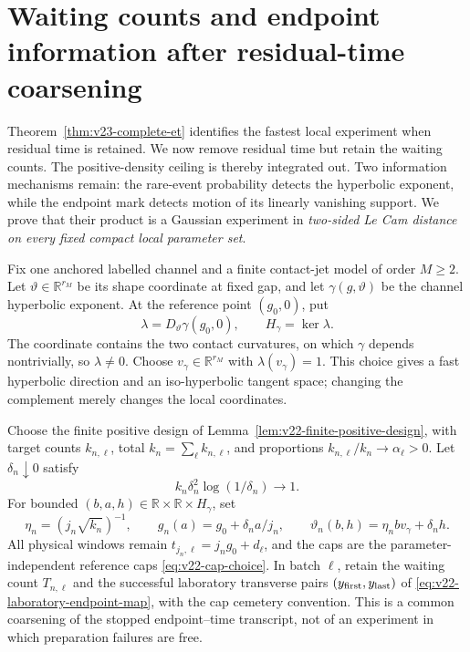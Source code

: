 \section{Waiting counts and endpoint information after residual-time coarsening}
\label{sec:v23-count-endpoint}

Theorem~\ref{thm:v23-complete-et} identifies the fastest local experiment
when residual time is retained.  We now remove residual time but retain the
waiting counts.  The positive-density ceiling is thereby integrated out.
Two information mechanisms remain: the rare-event probability detects the
hyperbolic exponent, while the endpoint mark detects motion of its linearly
vanishing support.  We prove that their product is a Gaussian experiment in
\emph{two-sided Le Cam distance on every fixed compact local parameter set}.

Fix one anchored labelled channel and a finite contact-jet model of order
\(M\ge2\).  Let \(\vartheta\in\mathbb R^{r_M}\) be its shape coordinate at
fixed gap, and let \(\gamma(g,\vartheta)\) be the channel hyperbolic exponent.
At the reference point \((g_0,0)\), put
\[
 \lambda=D_\vartheta\gamma(g_0,0),\qquad H_\gamma=\ker\lambda.
\]
The coordinate contains the two contact curvatures, on which \(\gamma\)
depends nontrivially, so \(\lambda\ne0\).  Choose
\(v_\gamma\in\mathbb R^{r_M}\) with \(\lambda(v_\gamma)=1\).
This choice gives a fast hyperbolic direction and an iso-hyperbolic tangent
space; changing the complement merely changes the local coordinates.

Choose the finite positive design of
Lemma~\ref{lem:v22-finite-positive-design}, with target counts
\(k_{n,\ell}\), total \(k_n=\sum_\ell k_{n,\ell}\), and proportions
\(k_{n,\ell}/k_n\to\alpha_\ell>0\).  Let \(\delta_n\downarrow0\) satisfy
\begin{equation}\label{eq:v23-count-endpoint-critical}
 k_n\delta_n^2\log(1/\delta_n)\longrightarrow1.
\end{equation}
For bounded \((b,a,h)\in\mathbb R\times\mathbb R\times H_\gamma\), set
\begin{equation}\label{eq:v23-count-endpoint-parameter}
 \eta_n=(j_n\sqrt{k_n})^{-1},\qquad
 g_n(a)=g_0+\delta_na/j_n,\qquad
 \vartheta_n(b,h)=\eta_nbv_\gamma+\delta_nh.
\end{equation}
All physical windows remain \(t_{j_n,\ell}=j_ng_0+d_\ell\), and the caps
are the parameter-independent reference caps
\eqref{eq:v22-cap-choice}.  In batch \(\ell\), retain the waiting count
\(T_{n,\ell}\) and the successful laboratory transverse pairs
\((y_{\rm first},y_{\rm last})\) of
\eqref{eq:v22-laboratory-endpoint-map}, with the cap cemetery convention.  This is a common coarsening of the stopped endpoint--time
transcript, not of an experiment in which preparation failures are free.


